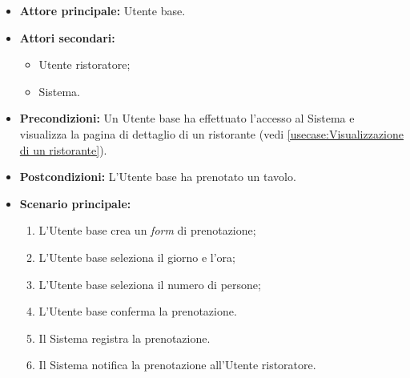 \label{usecase:Prenotazione di un tavolo}
\begin{itemize}
	\item \textbf{Attore principale:} Utente base.
	\item \textbf{Attori secondari:}
	      \begin{itemize}
		      \item Utente ristoratore;
		      \item Sistema.
	      \end{itemize}
	\item \textbf{Precondizioni:}
	      Un Utente base ha effettuato l'accesso al Sistema e visualizza la
	      pagina di dettaglio di un ristorante (vedi \autoref{usecase:Visualizzazione di un ristorante}).
	\item \textbf{Postcondizioni:}
	      L'Utente base ha prenotato un tavolo.
	\item \textbf{Scenario principale:}
	      \begin{enumerate}
		      \item L'Utente base crea un \textit{form} di prenotazione;
		      \item L'Utente base seleziona il giorno e l'ora;
		      \item L'Utente base seleziona il numero di persone;
		      \item L'Utente base conferma la prenotazione.
		      \item Il Sistema registra la prenotazione.
		      \item Il Sistema notifica la prenotazione all'Utente ristoratore.
	      \end{enumerate}
\end{itemize}

